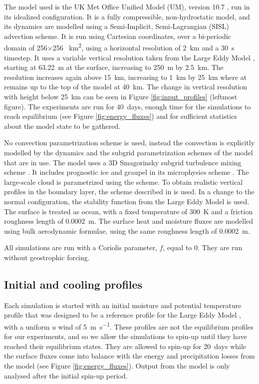\documentclass[11pt,a4paper]{article}
\begin{document}
The model used is the UK Met Office Unified Model (UM), version 10.7 \parencite{walters2017met}, run in its idealized configuration. It is a fully compressible, non-hydrostatic model, and its dynamics are modelled using a Semi-Implicit, Semi-Lagrangian (SISL) advection scheme. It is run using Cartesian coordinates, over a bi-periodic domain of 256$\times$256 \SI{}{km^2}, using a horizontal resolution of \SI{2}{km} and a \SI{30}{s} timestep. It uses a variable vertical resolution taken from the Large Eddy Model \parencite{petch2001sensitivity}, starting at \SI{63.22}{m} at the surface, increasing to \SI{250}{m} by \SI{2.5}{km}. The resolution increases again above \SI{15}{km}, increasing to \SI{1}{km} by \SI{25}{km} where at remains up to the top of the model at \SI{40}{km}. The change in vertical resolution with height below \SI{25}{km} can be seen in Figure \ref{fig:input_profiles} (leftmost figure).
The experiments are run for \SI{40}{days}, enough time for the simulations to reach equilibrium (see Figure \ref{fig:energy_fluxes}) and for sufficient statistics about the model state to be gathered. 

No convection parametrization scheme is used, instead the convection is explicitly modelled by the dynamics and the subgrid parametrization schemes of the model that are in use. The model uses a 3D Smagorinsky subgrid turbulence mixing scheme \parencite{todocite}. It includes prognostic ice and graupel in its microphysics scheme \parencite{todocite}. The large-scale cloud is parametrized using the \cite{smith1990scheme} scheme. To obtain realistic vertical profiles in the boundary layer, the scheme described in \cite{lock2000new} is used. In a change to the normal configuration, the stability function from the Large Eddy Model \parencite{petch2001sensitivity} is used. The surface is treated as ocean, with a fixed temperature of \SI{300}{K} and a friction roughness length of \SI{0.0002}{m}. The surface heat and moisture fluxes are modelled using bulk aerodynamic formulae, using the same roughness length of \SI{0.0002}{m}.

All simulations are run with a Coriolis parameter, $f$, equal to 0. They are run without geostrophic forcing.

\subsection{Initial and cooling profiles}

Each simulation is started with an initial moisture and potential temperature profile that was designed to be a reference profile for the Large Eddy Model \parencite{petch2001sensitivity}, with a uniform $u$ wind of \SI{5}{m.s^{-1}}. These profiles are not the equilibrium profiles for our experiments, and so we allow the simulations to spin-up until they have reached their equilibrium states. They are allowed to spin-up for \SI{20}{days} while the surface fluxes come into balance with the energy and precipitation losses from the model (see Figure \ref{fig:energy_fluxes}). Output from the model is only analysed after the initial spin-up period.
\end{document}
